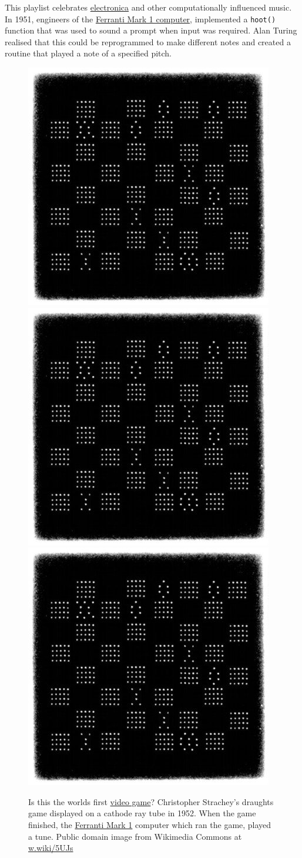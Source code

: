 \documentclass[
]{book}
\begin{document}
This playlist celebrates \href{https://en.wikipedia.org/wiki/Electronica}{electronica} and other computationally influenced music. In 1951, engineers of the \href{https://en.wikipedia.org/wiki/Ferranti_Mark_1}{Ferranti Mark 1 computer}, implemented a \texttt{hoot()} function that was used to sound a prompt when input was required. Alan Turing realised that this could be reprogrammed to make different notes and created a routine that played a note of a specified pitch. \citep{hooturing}

\begin{figure}
\includegraphics[width=0.33\linewidth]{images/draughts} \includegraphics[width=0.33\linewidth]{images/draughts} \includegraphics[width=0.33\linewidth]{images/draughts} \caption{Is this the worlds first \href{https://en.wikipedia.org/wiki/Video_game}{video game}? Christopher Strachey's draughts game displayed on a cathode ray tube in 1952. When the game finished, the \href{https://en.wikipedia.org/wiki/Ferranti_Mark_1}{Ferranti Mark 1} computer which ran the game, played a tune. Public domain image from Wikimedia Commons at \href{https://w.wiki/5UJs}{w.wiki/5UJs}}\label{fig:draughts-fig}
\end{figure}
\end{document}
